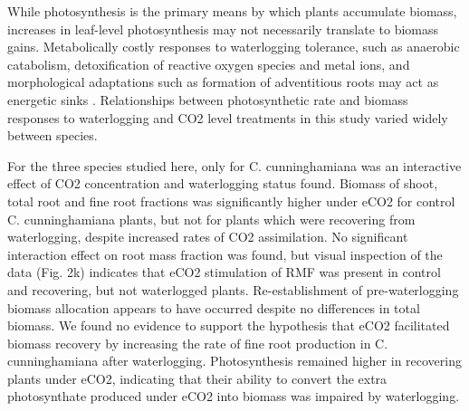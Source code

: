 \documentclass[12pt,a4paper]{memoir}
\begin{document}
While photosynthesis is the primary means by which plants accumulate biomass, increases in leaf-level photosynthesis may not necessarily translate to biomass gains. Metabolically costly responses to waterlogging tolerance, such as anaerobic catabolism, detoxification of reactive oxygen species and metal ions, and morphological adaptations such as formation of adventitious roots may act as energetic sinks \cite{Colmer2009}. Relationships between photosynthetic rate and biomass responses to waterlogging and CO2 level treatments in this study varied widely between species.

For the three species studied here, only for C. cunninghamiana was an interactive effect of CO2 concentration and waterlogging status found. Biomass of shoot, total root and fine root fractions was significantly higher under eCO2 for control C. cunninghamiana plants, but not for plants which were recovering from waterlogging, despite increased rates of CO2 assimilation. No significant interaction effect on root mass fraction was found, but visual inspection of the data (Fig. 2k) indicates that eCO2 stimulation of RMF was present in control and recovering, but not waterlogged plants. Re-establishment of pre-waterlogging biomass allocation appears to have occurred despite no differences in total biomass. We found no evidence to support the hypothesis that eCO2 facilitated biomass recovery by increasing the rate of fine root production in C. cunninghamiana after waterlogging. Photosynthesis remained higher in recovering plants under eCO2, indicating that their ability to convert the extra photosynthate produced under eCO2 into biomass was impaired by waterlogging. 
\end{document}

